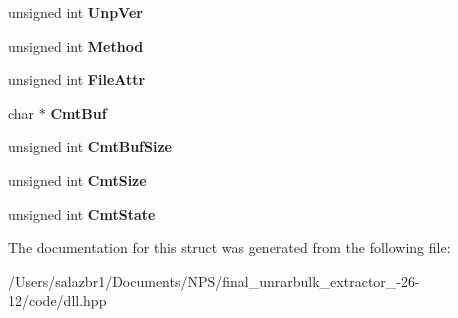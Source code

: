 \begin{DoxyCompactItemize}
\item 
\hypertarget{struct_r_a_r_header_data_a4c3249ba99a21d772ca1e341b60b4c16}{unsigned int {\bfseries Unp\-Ver}}\label{struct_r_a_r_header_data_a4c3249ba99a21d772ca1e341b60b4c16}

\item 
\hypertarget{struct_r_a_r_header_data_ad8566b96cb5350a6ff3635359fb28bda}{unsigned int {\bfseries Method}}\label{struct_r_a_r_header_data_ad8566b96cb5350a6ff3635359fb28bda}

\item 
\hypertarget{struct_r_a_r_header_data_a758c6a5d8d772bc23b62ca5b6b770d3a}{unsigned int {\bfseries File\-Attr}}\label{struct_r_a_r_header_data_a758c6a5d8d772bc23b62ca5b6b770d3a}

\item 
\hypertarget{struct_r_a_r_header_data_ae0e526f6298d357d17a577c69b46eee6}{char $\ast$ {\bfseries Cmt\-Buf}}\label{struct_r_a_r_header_data_ae0e526f6298d357d17a577c69b46eee6}

\item 
\hypertarget{struct_r_a_r_header_data_a0905ceb9689f24b6beca81d4fb4d1b75}{unsigned int {\bfseries Cmt\-Buf\-Size}}\label{struct_r_a_r_header_data_a0905ceb9689f24b6beca81d4fb4d1b75}

\item 
\hypertarget{struct_r_a_r_header_data_a49296acad070c927066615724a5542d2}{unsigned int {\bfseries Cmt\-Size}}\label{struct_r_a_r_header_data_a49296acad070c927066615724a5542d2}

\item 
\hypertarget{struct_r_a_r_header_data_a092b072ba7fd1c1ae64cc4aca62a9226}{unsigned int {\bfseries Cmt\-State}}\label{struct_r_a_r_header_data_a092b072ba7fd1c1ae64cc4aca62a9226}

\end{DoxyCompactItemize}


The documentation for this struct was generated from the following file\-:\begin{DoxyCompactItemize}
\item 
/\-Users/salazbr1/\-Documents/\-N\-P\-S/final\-\_\-unrarbulk\-\_\-extractor\-\_-\/26-\/12/code/dll.\-hpp\end{DoxyCompactItemize}
